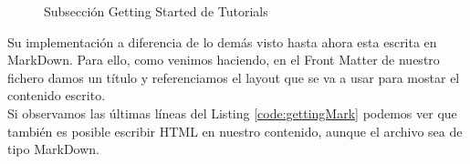\begin{figure}[h!]
    \centering
    \par
    \par
    \caption{Subsección Getting Started de Tutorials }
    \label{fig:gettinWeb}
\end{figure}

Su implementación a diferencia de lo demás visto hasta ahora esta escrita en MarkDown. Para ello, como venimos haciendo, en el Front Matter de nuestro fichero damos un título y referenciamos el layout que se va a usar para mostar el contenido escrito. \\

Si observamos las  últimas líneas del Listing \ref{code:gettingMark} podemos ver que también es posible escribir HTML en nuestro contenido, aunque el archivo sea de tipo MarkDown.

